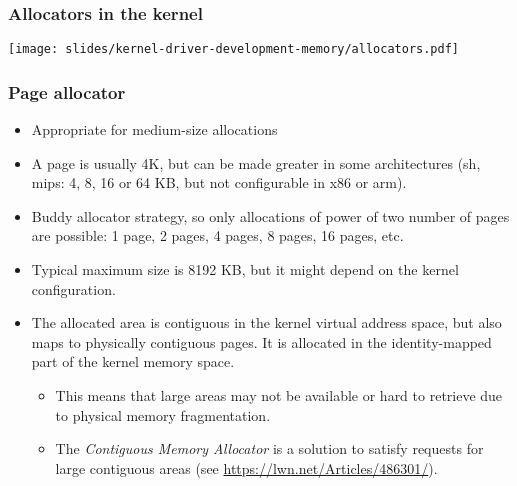 \begin{frame}
  \frametitle{Allocators in the kernel}
  \begin{center}
    \texttt{[image: slides/kernel-driver-development-memory/allocators.pdf]}
  \end{center}
\end{frame}

\begin{frame}[fragile]
  \frametitle{Page allocator}
  \begin{itemize}
  \item Appropriate for medium-size allocations
  \item A page is usually 4K, but can be made greater in some
    architectures (sh, mips: 4, 8, 16 or 64 KB, but not configurable in
    x86 or arm).
  \item Buddy allocator strategy, so only allocations of power of two
    number of pages are possible: 1 page, 2 pages, 4 pages, 8 pages,
    16 pages, etc.
  \item Typical maximum size is 8192 KB, but it might depend on the
    kernel configuration.
  \item The allocated area is contiguous in the kernel virtual address
    space, but also maps to physically contiguous pages. It is
    allocated in the identity-mapped part of the kernel memory space.
    \begin{itemize}
    \item This means that large areas may not be available or hard to
      retrieve due to physical memory fragmentation.
    \item The {\em Contiguous Memory Allocator} is a solution to
	  satisfy requests for large contiguous areas (see
          \url{https://lwn.net/Articles/486301/}).
    \end{itemize}
  \end{itemize}
\end{frame}

